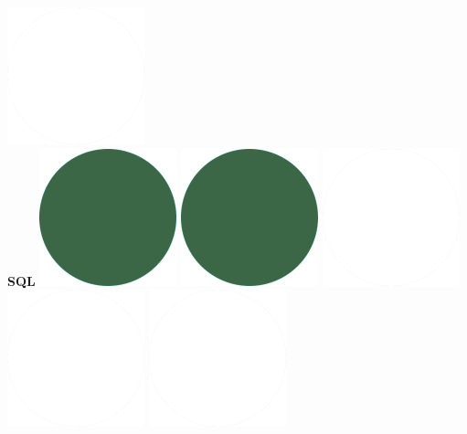 \documentclass[a4paper]{friggeri-cv_reccius-experiment}
\begin{document}
\begin{aside}
    \includegraphics[scale=0.11]{img/WhiteDots.png}\\
    \belowspace
    \textbf{SQL}\hfill
    \includegraphics[scale=0.11]{img/IPSGreenDots.png}
    \includegraphics[scale=0.11]{img/IPSGreenDots.png}
    \includegraphics[scale=0.11]{img/WhiteDots.png}
    \includegraphics[scale=0.11]{img/WhiteDots.png}
    \includegraphics[scale=0.11]{img/WhiteDots.png}

\end{aside}
\end{document}
